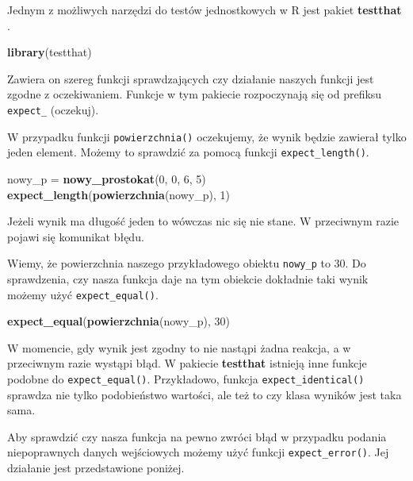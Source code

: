 \documentclass[paper=6in:9in,pagesize=pdftex,headinclude=on,footinclude=on,10pt]{scrbook}
\newenvironment{Shaded}{\begin{snugshade}}{\end{snugshade}}
\newcommand{\DecValTok}[1]{\textcolor[rgb]{0.00,0.00,0.81}{#1}}
\newcommand{\KeywordTok}[1]{\textcolor[rgb]{0.13,0.29,0.53}{\textbf{#1}}}
\newcommand{\NormalTok}[1]{#1}
\newcommand{\StringTok}[1]{\textcolor[rgb]{0.31,0.60,0.02}{#1}}
\begin{document}
Jednym z możliwych narzędzi do testów jednostkowych w R jest pakiet \textbf{testthat} \citep{R-testthat}.

\begin{Shaded}
\begin{Highlighting}[]
\KeywordTok{library}\NormalTok{(testthat)}
\end{Highlighting}
\end{Shaded}

Zawiera on szereg funkcji sprawdzających czy działanie naszych funkcji jest zgodne z oczekiwaniem.
Funkcje w tym pakiecie rozpoczynają się od prefiksu \texttt{expect\_} (oczekuj).

W przypadku funkcji \texttt{powierzchnia()} oczekujemy, że wynik będzie zawierał tylko jeden element.
Możemy to sprawdzić za pomocą funkcji \texttt{expect\_length()}.

\begin{Shaded}
\begin{Highlighting}[]
\NormalTok{nowy_p =}\StringTok{ }\KeywordTok{nowy_prostokat}\NormalTok{(}\DecValTok{0}\NormalTok{, }\DecValTok{0}\NormalTok{, }\DecValTok{6}\NormalTok{, }\DecValTok{5}\NormalTok{)}
\KeywordTok{expect_length}\NormalTok{(}\KeywordTok{powierzchnia}\NormalTok{(nowy_p), }\DecValTok{1}\NormalTok{)}
\end{Highlighting}
\end{Shaded}

Jeżeli wynik ma długość jeden to wówczas nic się nie stane.
W przeciwnym razie pojawi się komunikat błędu.

Wiemy, że powierzchnia naszego przykładowego obiektu \texttt{nowy\_p} to 30.
Do sprawdzenia, czy nasza funkcja daje na tym obiekcie dokładnie taki wynik możemy użyć \texttt{expect\_equal()}.

\begin{Shaded}
\begin{Highlighting}[]
\KeywordTok{expect_equal}\NormalTok{(}\KeywordTok{powierzchnia}\NormalTok{(nowy_p), }\DecValTok{30}\NormalTok{)}
\end{Highlighting}
\end{Shaded}

W momencie, gdy wynik jest zgodny to nie nastąpi żadna reakcja, a w przeciwnym razie wystąpi błąd.
W pakiecie \textbf{testthat} istnieją inne funkcje podobne do \texttt{expect\_equal()}.
Przykładowo, funkcja \texttt{expect\_identical()} sprawdza nie tylko podobieństwo wartości, ale też to czy klasa wyników jest taka sama.

Aby sprawdzić czy nasza funkcja na pewno zwróci błąd w przypadku podania niepoprawnych danych wejściowych możemy użyć funkcji \texttt{expect\_error()}.
Jej działanie jest przedstawione poniżej.
\end{document}
